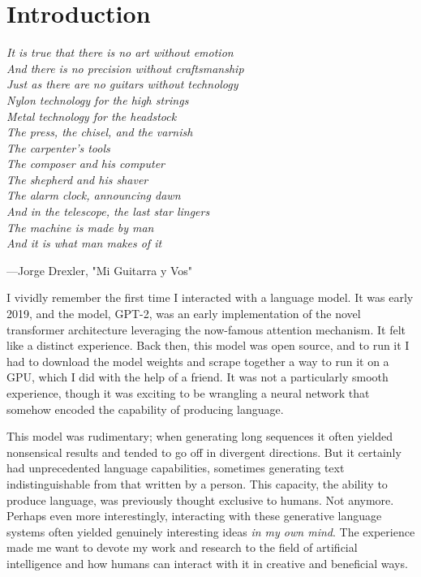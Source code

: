 \chapter[Introduction]{Introduction}


\begin{flushleft}
\begin{minipage}[t]{0.80\textwidth}
\textit{It is true that there is no art without emotion\\
And there is no precision without craftsmanship\\
Just as there are no guitars without technology\\
Nylon technology for the high strings\\
Metal technology for the headstock\\
The press, the chisel, and the varnish\\
The carpenter's tools\\
The composer and his computer\\
The shepherd and his shaver\\
The alarm clock, announcing dawn\\
And in the telescope, the last star lingers\\
The machine is made by man\\
And it is what man makes of it}
\end{minipage}

\medskip
\hfill---Jorge Drexler, "Mi Guitarra y Vos"
\end{flushleft}

\bigskip

I vividly remember the first time I interacted with a language model. It was early 2019, and the model, GPT-2, was an early implementation of the novel transformer architecture leveraging the now-famous attention mechanism. It felt like a distinct experience. Back then, this model was open source, and to run it I had to download the model weights and scrape together a way to run it on a GPU, which I did with the help of a friend. It was not a particularly smooth experience, though it was exciting to be wrangling a neural network that somehow encoded the capability of producing language.

This model was rudimentary; when generating long sequences it often yielded nonsensical results and tended to go off in divergent directions. But it certainly had unprecedented language capabilities, sometimes generating text indistinguishable from that written by a person. This capacity, the ability to produce language, was previously thought exclusive to humans. Not anymore. Perhaps even more interestingly, interacting with these generative language systems often yielded genuinely interesting ideas \textit{in my own mind}.  The experience made me want to devote my work and research to the field of artificial intelligence and how humans can interact with it in creative and beneficial ways.

